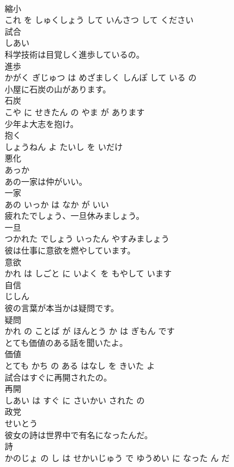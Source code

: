 \documentclass[8pt]{extreport}
\begin{document}
\begin{CJK}{UTF8}{min}
\\	縮小 
\\	これ を しゅくしょう して いんさつ して ください		
\\	試合	
\\	しあい		
\\	科学技術は目覚しく進歩しているの。	
\\	進歩 
\\	かがく ぎじゅつ は めざましく しんぽ して いる の		
\\	小屋に石炭の山があります。	
\\	石炭 
\\	こや に せきたん の やま が あります		
\\	少年よ大志を抱け。	
\\	抱く 
\\	しょうねん よ たいし を いだけ		
\\	悪化	
\\	あっか		
\\	あの一家は仲がいい。	
\\	一家 
\\	あの いっか は なか が いい		
\\	疲れたでしょう、一旦休みましょう。	
\\	一旦 
\\	つかれた でしょう いったん やすみましょう		
\\	彼は仕事に意欲を燃やしています。	
\\	意欲 
\\	かれ は しごと に いよく を もやして います		
\\	自信	
\\	じしん		
\\	彼の言葉が本当かは疑問です。	
\\	疑問 
\\	かれ の ことば が ほんとう か は ぎもん です		
\\	とても価値のある話を聞いたよ。	
\\	価値 
\\	とても かち の ある はなし を きいた よ		
\\	試合はすぐに再開されたの。	
\\	再開 
\\	しあい は すぐ に さいかい された の		
\\	政党	
\\	せいとう		
\\	彼女の詩は世界中で有名になったんだ。	
\\	詩 
\\	かのじょ の し は せかいじゅう で ゆうめい に なった ん だ		

\end{CJK}
\end{document}
